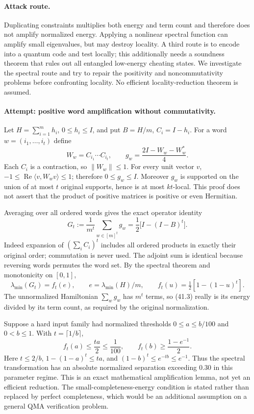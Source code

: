 \documentclass[11pt,a4paper]{article}
\numberwithin{equation}{section}
\begin{document}
\paragraph{Attack route.}
Duplicating constraints multiplies both energy and term count and therefore
does not amplify normalized energy. Applying a nonlinear spectral function
can amplify small eigenvalues, but may destroy locality. A third route is
to encode into a quantum code and test locally; this additionally needs a
soundness theorem that rules out all entangled low-energy cheating states.
We investigate the spectral route and try to repair the positivity and
noncommutativity problems before confronting locality. No efficient
locality-reduction theorem is assumed.

\paragraph{Attempt: positive word amplification without commutativity.}
Let $H=\sum_{i=1}^m h_i$, $0\le h_i\le I$, and put
$B=H/m$, $C_i=I-h_i$. For a word $w=(i_1,\ldots,i_t)$ define
\[
 W_w=C_{i_1}\cdots C_{i_t},\qquad
 g_w=\frac{2I-W_w-W_w^*}{4}.
 \tag{41.1}
\]
Each $C_i$ is a contraction, so $\|W_w\|\le1$.
For every unit vector $v$,
$-1\le\operatorname{Re}\langle v,W_wv\rangle\le1$;
therefore $0\le g_w\le I$. Moreover $g_w$ is supported on the union of
at most $t$ original supports, hence is at most $kt$-local.
This proof does not assert that the product of positive matrices is
positive or even Hermitian.

Averaging over all ordered words gives the exact operator identity
\[
 G_t:=\frac1{m^t}\sum_{w\in[m]^t}g_w
   =\frac12\bigl[I-(I-B)^t\bigr].
 \tag{41.2}
\]
Indeed expansion of $(\sum_i C_i)^t$ includes all ordered products in
exactly their original order; commutation is never used. The adjoint sum
is identical because reversing words permutes the word set. By the
spectral theorem and monotonicity on $[0,1]$,
\[
 \lambda_{\min}(G_t)=f_t(e),\qquad
 e=\lambda_{\min}(H)/m,\qquad
 f_t(u)=\tfrac12[1-(1-u)^t].
 \tag{41.3}
\]
The unnormalized Hamiltonian $\sum_wg_w$ has $m^t$ terms, so (41.3)
really is its energy divided by its term count, as required by the
original normalization.

Suppose a hard input family had normalized thresholds $0\le a\le b/100$
and $0<b\le1$. With $t=\lceil1/b\rceil$,
\[
 f_t(a)\le\frac{ta}{2}\le\frac1{100},\qquad
 f_t(b)\ge\frac{1-e^{-1}}2.
 \tag{41.4}
\]
Here $t\le2/b$, $1-(1-a)^t\le ta$, and
$(1-b)^t\le e^{-tb}\le e^{-1}$. Thus the spectral transformation has
an absolute normalized separation exceeding $0.30$ in this parameter
regime. This is an exact mathematical amplification lemma, not yet an
efficient reduction. The small-completeness-energy condition is stated
rather than replaced by perfect completeness, which would be an additional
assumption on a general QMA verification problem.
\end{document}
